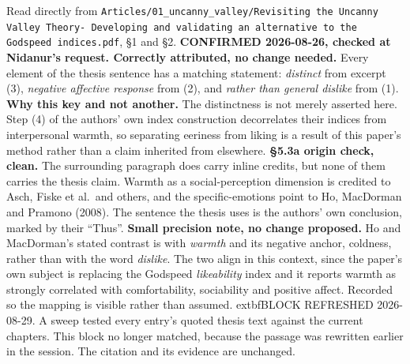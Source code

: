 \documentclass[11pt, a4paper]{article}
\begin{document}
\begin{Form}
  {Read directly from \texttt{\footnotesize Articles/01\_uncanny\_valley/Revisiting the Uncanny Valley Theory- Developing and validating an alternative to the Godspeed indices.pdf}, \S1 and \S2. \textbf{CONFIRMED 2026-08-26, checked at Nidanur's request. Correctly attributed, no change needed.} Every element of the thesis sentence has a matching statement: \emph{distinct} from excerpt (3), \emph{negative affective response} from (2), and \emph{rather than general dislike} from (1). \textbf{Why this key and not another.} The distinctness is not merely asserted here. Step (4) of the authors' own index construction decorrelates their indices from interpersonal warmth, so separating eeriness from liking is a result of this paper's method rather than a claim inherited from elsewhere. \textbf{\S5.3a origin check, clean.} The surrounding paragraph does carry inline credits, but none of them carries the thesis claim. Warmth as a social-perception dimension is credited to Asch, Fiske et al.\ and others, and the specific-emotions point to Ho, MacDorman and Pramono (2008). The sentence the thesis uses is the authors' own conclusion, marked by their ``Thus''. \textbf{Small precision note, no change proposed.} Ho and MacDorman's stated contrast is with \emph{warmth} and its negative anchor, coldness, rather than with the word \emph{dislike}. The two align in this context, since the paper's own subject is replacing the Godspeed \emph{likeability} index and it reports warmth as strongly correlated with comfortability, sociability and positive affect. Recorded so the mapping is visible rather than assumed. 	extbf{BLOCK REFRESHED 2026-08-29.} A sweep tested every entry's quoted thesis text against the current chapters. This block no longer matched, because the passage was rewritten earlier in the session. The citation and its evidence are unchanged.}



\end{Form}
\end{document}
